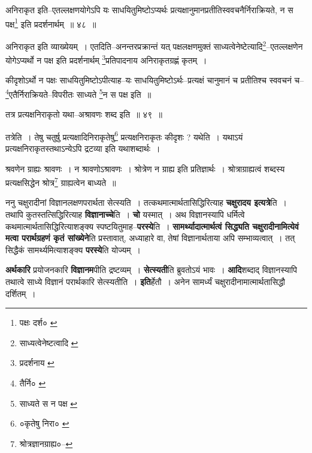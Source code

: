 \documentclass[article,12pt,a4paper]{memoir}
\begin{document}
	  \pstart अनिराकृत इति--एतल्लक्षणयोगेऽपि यः साधयितुमिष्टोऽप्यर्थः प्रत्यक्षानुमानप्रतीतिस्ववचनैर्निराक्रियते, न स पक्ष\footnote{पक्षः दर्श० \cite{dp-msC}} इति प्रदर्शनार्थम् ॥ ४८ ॥
	\pend
      
	  \endgroup
	
	  \bigskip
	  \begingroup
	

	  \pstart अनिराकृत इति व्याख्येयम् । एतदिति--अनन्तरप्रक्रान्तं यत् पक्षलक्षणमुक्तं साध्यत्वेनेष्टेत्यादि\footnote{साध्यत्वेनेष्टत्वादि \cite{dp-msC} \cite{dp-msD}}\---एतल्लक्षणेन योगेऽप्यर्थो न पक्ष इति प्रदर्शनार्थम् \footnote{प्रदर्शनाय \cite{dp-msA} \cite{dp-msC} \cite{dp-edP} \cite{dp-edH}}\-प्रतिपादनाय अनिराकृतग्रह्णं कृतम् ।
	\pend
       

	  \pstart कीदृशोऽर्थो न पक्षः साधयितुमिष्टोऽपीत्याह--यः साधयितुमिष्टोऽर्थः--प्रत्यक्षं चानुमानं च प्रतीतिश्च स्ववचनं च--\footnote{तैर्नि० \cite{dp-edE} \cite{dp-edN}}\-एतैर्निराक्रियते--विपरीतः साध्यते \footnote{साध्यते स न पक्ष \cite{dp-msB} \cite{dp-msD}}\-न स पक्ष इति ॥
	\pend
       
	  \bigskip
	  \begingroup
	

	  \pstart तत्र प्रत्यक्षनिराकृतो यथा--अश्रावणः शब्द इति ॥ ४९ ॥
	\pend
      
	  \endgroup
	 

	  \pstart तत्रेति । तेषु चतुर्षु प्रत्यक्षादिनिराकृतेषु\footnote{०कृतेषु निरा० \cite{dp-msB}} प्रत्यक्षनिराकृतः कीदृशः ? यथेति । यथाऽयं प्रत्यक्षनिराकृतस्तथाऽन्येऽपि द्रटव्या इति यथाशब्दार्थः ।
	\pend
       

	  \pstart श्रवणेन ग्राह्यः श्रावणः । न श्रावणोऽश्रावणः । श्रोत्रेण न ग्राह्य इति प्रतिज्ञार्थः । श्रोत्राग्राह्यत्वं शब्दस्य प्रत्यक्षसिद्धेन श्रोत्र\footnote{श्रोत्रज्ञानग्राह्य०--\cite{dp-msD-n}} ग्राह्यत्वेन बाध्यते ॥
	\pend
      
	  \endgroup
	

	  \pstart ननु चक्षुरादीनां विज्ञानलक्षणपरार्थता सेत्स्यति । तत्कथमात्मार्थतासिद्धिरित्याह \textbf{चक्षुरादय इत्यत्रे}ति । तथापि कुतस्तत्सिद्धिरित्याह \textbf{विज्ञानाच्चे}ति । \textbf{चो} यस्मात् । अथ विज्ञानस्यापि धर्मित्वे कथमात्मार्थतासिद्धिरित्याशङ्क्य स्पष्टयितुमाह--\textbf{परस्ये}ति । \textbf{सामर्थ्यादात्मार्थत्वं सिद्ध्यति चक्षुरादीनामित्येवं मत्वा परार्थग्रहणं कृतं सांख्येने}ति प्रस्तावात्, अध्याहारे वा, तेषां विज्ञानार्थताया अपि सम्भाव्यत्वात् । तत् सिद्धैकं सामर्थ्यमित्याशङ्क्य \textbf{परस्ये}ति योज्यम् ।
	\pend
      

	  \pstart \textbf{अर्थकारि} प्रयोजनकारि \textbf{विज्ञानम}पीति द्रष्टव्यम् । \textbf{सेत्स्यती}ति ब्रुवतोऽयं भावः । \textbf{आदि}शब्दाद् विज्ञानस्यापि तथात्वे साध्ये विज्ञानं परार्थकारि सेत्स्यतीति । \textbf{इति}र्हेतौ । अनेन सामर्ध्यं चक्षुरादीनामात्मार्थतासिद्धौ दर्शितम् ।
	\pend
      
\end{document}
